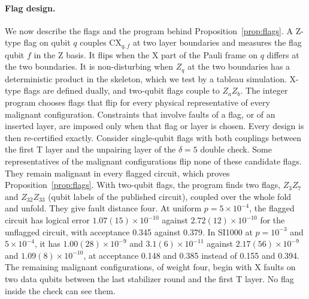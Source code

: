 \documentclass[aps,prl,reprint,twocolumn,amsmath,amssymb,floatfix,nofootinbib,superscriptaddress]{revtex4-2}
\theoremstyle{definition}
\theoremstyle{remark}
\begin{document}
\paragraph*{Flag design.}
We now describe the flags and the program behind Proposition~\ref{prop:flags}. A Z-type flag on qubit $q$ couples $\mathrm{CX}_{q,f}$ at two layer boundaries and measures the flag qubit $f$ in the Z basis. It flips when the X part of the Pauli frame on $q$ differs at the two boundaries. It is non-disturbing when $Z_q$ at the two boundaries has a deterministic product in the skeleton, which we test by a tableau simulation. X-type flags are defined dually, and two-qubit flags couple to $Z_aZ_b$. The integer program chooses flags that flip for every physical representative of every malignant configuration. Constraints that involve faults of a flag, or of an inserted layer, are imposed only when that flag or layer is chosen. Every design is then re-certified exactly. Consider single-qubit flags with both couplings between the first T layer and the unpairing layer of the $\delta=5$ double check. Some representatives of the malignant configurations flip none of these candidate flags. They remain malignant in every flagged circuit, which proves Proposition~\ref{prop:flags}. With two-qubit flags, the program finds two flags, $Z_3Z_7$ and $Z_{32}Z_{33}$ (qubit labels of the published circuit), coupled over the whole fold and unfold. They give fault distance four. At uniform $p=5\times10^{-4}$, the flagged circuit has logical error $1.07(15)\times10^{-10}$ against $2.72(12)\times10^{-10}$ for the unflagged circuit, with acceptance 0.345 against 0.379. In SI1000 at $p=10^{-3}$ and $5\times10^{-4}$, it has $1.00(28)\times10^{-9}$ and $3.1(6)\times10^{-11}$ against $2.17(56)\times10^{-9}$ and $1.09(8)\times10^{-10}$, at acceptance 0.148 and 0.385 instead of 0.155 and 0.394. The remaining malignant configurations, of weight four, begin with X faults on two data qubits between the last stabilizer round and the first T layer. No flag inside the check can see them.
\end{document}
